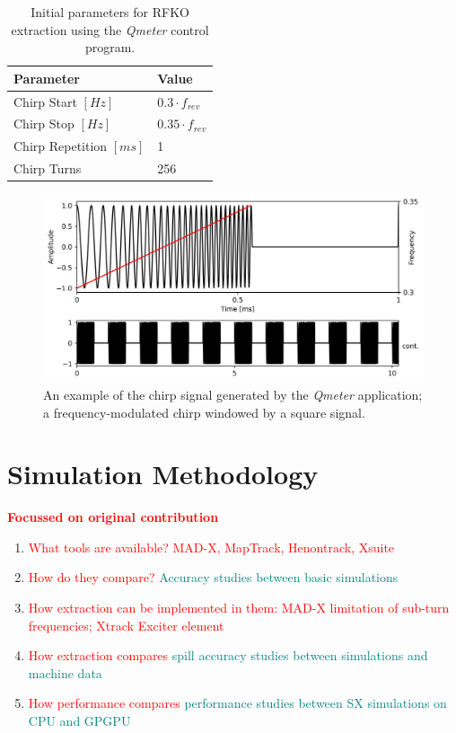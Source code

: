 \documentclass[11pt]{report}
\newcommand\todo[1]{\textcolor{red}{#1}}
\begin{document}
\begin{table}[]
  \centering
  \begin{tabular}{ll}
    \centering
  Parameter                 & Value                  \\ \hline \hline
  Chirp Start $[Hz]$        & $0.3\cdot f_{rev}$     \\
  Chirp Stop $[Hz]$         & $0.35\cdot f_{rev}$    \\
  Chirp Repetition $[ms]$   & 1                      \\
  Chirp Turns               & 256                   
  \end{tabular}
  \caption{Initial parameters for RFKO extraction using the \textit{Qmeter} control program.}\label{tab:qmeter-params}
\end{table}

\begin{figure}
  \centering
  \includegraphics[width=0.6\linewidth]{fake-signal.png}
  \caption{An example of the chirp signal generated by the \textit{Qmeter} application; a frequency-modulated chirp windowed by a square signal.}\label{fig:qmeter-signal}
\end{figure}


\section{Simulation Methodology}
\todo{\textbf{Focussed on original contribution}}
\begin{enumerate}
    \item \todo{What tools are available? MAD-X, MapTrack, Henontrack, Xsuite}
    \item \todo{How do they compare?} \textcolor{teal}{Accuracy studies between basic simulations}
    \item \todo{How extraction can be implemented in them: MAD-X limitation of sub-turn frequencies; Xtrack Exciter element}
    \item \todo{How extraction compares} \textcolor{teal}{spill accuracy studies between simulations and machine data}
    \item \todo{How performance compares} \textcolor{teal}{performance studies between SX simulations on CPU and GPGPU}
\end{enumerate}
\end{document}
